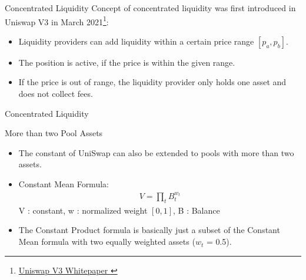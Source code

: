 \documentclass[]{beamer}
\begin{document}
\begin{frame}{Concentrated Liquidity}
	Concept of concentrated liquidity was first introduced in Uniswap V3 in March 2021\footnote{\href{https://uniswap.org/whitepaper-v3.pdf}{Uniswap V3 Whitepaper \link}}:
	\begin{itemize}
		\item<2-> Liquidity providers can add liquidity within a certain price range $[p_a, p_b]$.
		\item<3-> The position is active, if the price is within the given range.
		\item<4-> If the price is out of range, the liquidity provider only holds one asset and does not collect fees.
	\end{itemize}
	\vspace{0.5cm}
\end{frame}


\begin{frame}{Concentrated Liquidity}
	\begin{figure}[h!]
		\begin{center}
			
		\end{center}
	\end{figure}	
\end{frame}


\begin{frame}{More than two Pool Assets}
\begin{itemize}
	\item The constant of UniSwap can also be extended to pools with more than two assets.
	\item Constant Mean Formula:
		\begin{align*}
			V = \prod_t B^{w_{t}}_{t}
		\end{align*}
	V : constant, w : normalized weight $[0,1]$, B : Balance
	\item The Constant Product formula is basically just a subset of the Constant Mean formula with two equally weighted assets ($w_t$ = 0.5).
\end{itemize}

\end{frame}
\end{document}
